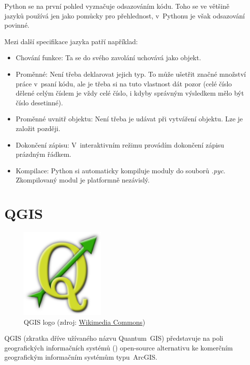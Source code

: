 Python se na první pohled vyznačuje odsazováním kódu. Toho se ve většině jazyků používá jen jako
pomůcky pro přehlednost, v~Pythonu je však odsazování povinné. 

Mezi další specifikace jazyka patří například: 
\begin{itemize}

	\item Chování funkce: Ta se do svého zavolání uchovává jako objekt. 
	
	\item Proměnné: Není třeba deklarovat jejich typ. To může ušetřit značné množství práce
	v~psaní kódu, ale je třeba si na tuto vlastnost dát pozor (celé číslo dělené celým číslem je
	vždy celé číslo, i kdyby správným výsledkem mělo být číslo desetinné). 
	
	\item Proměnné uvnitř objektu: Není třeba je udávat při vytváření objektu. Lze je založit později. 
	
	\item Dokončení zápisu: V~interaktivním režimu provádím dokončení zápisu prázdným řádkem. 
	
	\item Kompilace: Python si automaticky kompiluje moduly do souborů \textit{.pyc}. Zkompilovaný
	modul je platformně nezávislý. 

\end{itemize}


\section{QGIS}
\label{qgis}

  \begin{figure}[H]
    \centering
      \includegraphics[width=120pt]{./pictures/qgis.png}
      \caption[QGIS logo]{QGIS logo 
      (zdroj: \href{https://commons.wikimedia.org/wiki/File:QGIS\_logo.svg}{Wikimedia Commons})}
      \label{fig:qgis}
  \end{figure}

QGIS (zkratka dříve užívaného názvu Quantum~GIS) představuje na poli geogra\-fic\-kých informačních systémů () open-source alternativu ke komerčním geografic\-kým informačním systémům typu~ArcGIS. 

